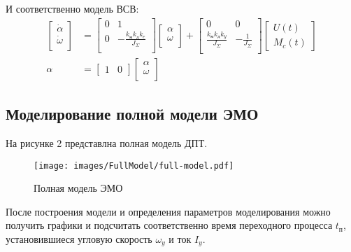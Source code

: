 \documentclass[a4paper, 12pt]{article}
\begin{document}
	И соответственно модель ВСВ: 
	\begin{align}
	\begin{bmatrix}
	\dot{\alpha} \\
	\dot{\omega} \\
	\end{bmatrix} & = 
	\begin{bmatrix}
	0 & 1 \\
	0 & -\frac{k_\text{м}k_\text{д}k_e}{J_\Sigma} \\
	\end{bmatrix}
	\begin{bmatrix}
	\alpha \\
	\omega \\
	\end{bmatrix} + 
	\begin{bmatrix}
	0 & 0 \\
	\frac{k_\text{м}k_\text{д}k_y}{J_\Sigma} & -\frac{1}{J_\Sigma} \\
	\end{bmatrix}
	\begin{bmatrix}
	U(t) \\
	M_c(t)
	\end{bmatrix} \\
	\alpha & = 
	\begin{bmatrix}
	1 & 0 
	\end{bmatrix}
	\begin{bmatrix}
	\alpha \\
	\omega \\
	\end{bmatrix}
	\end{align}
	
	\newpage
	\begin{center}
		\section{Моделирование полной модели ЭМО}
	\end{center}
	\par На рисунке 2 представлна полная модель ДПТ.
	\begin{figure}[h!]
		\centering
		\texttt{[image: images/FullModel/full-model.pdf]}
		\caption{Полная модель ЭМО}
	\end{figure}
	
	После построения модели и определения параметров моделирования можно получить графики и подсчитать соответственно время переходного процесса $t_\text{п}$, установившиеся угловую скорость $\omega_y$ и ток $I_y$.
	
\end{document}
